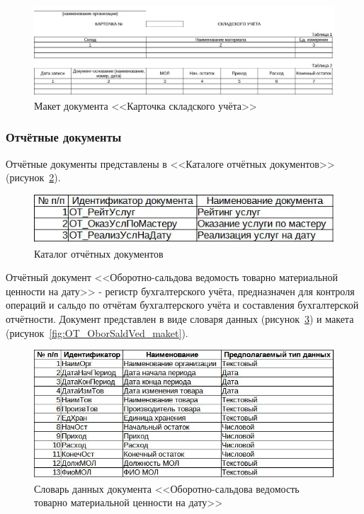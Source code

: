 \documentclass[12pt, a4paper, simple]{eskdtext}
\begin{document}
    \begin{figure}[p!h]
        \centering
        \includegraphics[width=16cm]
            {_docs/ОД_КартСклУч_макет.jpg}
        \caption{Макет документа <<Карточка складского учёта>>}
        \label{fig:od_KartSklYch_maket}
    \end{figure}


    \newpage
    \subsubsection{Отчётные документы}

    Отчётные документы представлены в <<Каталоге отчётных документов>> (рисунок~\ref{fig:OT}).
    
    \begin{figure}[!h]
        \centering
        \includegraphics[]
            {_docs/ОТ.jpg}
        \caption{Каталог отчётных документов}
        \label{fig:OT}
    \end{figure}

    Отчётный документ <<Оборотно-сальдова ведомость товарно материальной ценности на дату>>
    - регистр бухгалтерского учёта, предназначен для контроля операций
    и сальдо по отчётам бухгалтерского учёта и составления бухгалтерской отчётности.
    Документ представлен в виде словаря данных (рисунок~\ref{fig:OT_OborSaldVed_tipi})
    и макета (рисунок~\ref{fig:OT_OborSaldVed_maket}).

    \begin{figure}[!h]
        \centering
        \includegraphics[]
            {_docs/ОТ_ОборСальдВед_типы.jpg}
        \caption{Словарь данных документа <<Оборотно-сальдова ведомость товарно материальной ценности на дату>>}
        \label{fig:OT_OborSaldVed_tipi}
    \end{figure}
\end{document}
